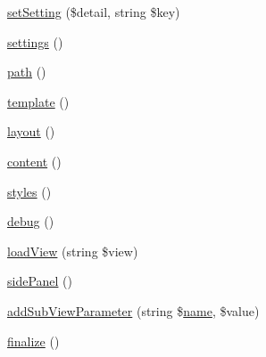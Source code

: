 \begin{DoxyCompactItemize}
\hyperlink{class_lora_1_1_page_a1d32f1ec82bc539460db5c0666b18a76}{set\+Setting} (\$detail, string \$key)
\item 
\hyperlink{class_lora_1_1_page_ad7354383714c6ae99d6ee1bfb95ab49f}{settings} ()
\item 
\hyperlink{class_lora_1_1_page_a3b05eec13add53df44e232273d718ae4}{path} ()
\item 
\hyperlink{class_lora_1_1_page_a0b54c9d3801b331b75487ef78d98c06b}{template} ()
\item 
\hyperlink{class_lora_1_1_page_a0e9447221830f8629717836bd933a164}{layout} ()
\item 
\hyperlink{class_lora_1_1_page_a9b80bb36f89498eac4f43bf08461240d}{content} ()
\item 
\hyperlink{class_lora_1_1_page_a53d31780f290c90071a213e9f786abb3}{styles} ()
\item 
\hyperlink{class_lora_1_1_page_aaed74f7942d3fc56582e99324500e87b}{debug} ()
\item 
\hyperlink{class_lora_1_1_page_a943f0df56a6f8dbc260ddb31925ce4f6}{load\+View} (string \$view)
\item 
\hyperlink{class_lora_1_1_page_aac68ba2faa04ea9430b52d4de572d085}{side\+Panel} ()
\item 
\hyperlink{class_lora_1_1_page_aa8d28fe10b4fca78ce8b5b4de36b0aad}{add\+Sub\+View\+Parameter} (string \$\hyperlink{class_lora_1_1_page_a4b516aaa5fa38da4fed24ab6001627e2}{name}, \$value)
\item 
\hyperlink{class_lora_1_1_page_a9caaa1f5ea6177e55f13ebe7dec2bd60}{finalize} ()
\end{DoxyCompactItemize}
